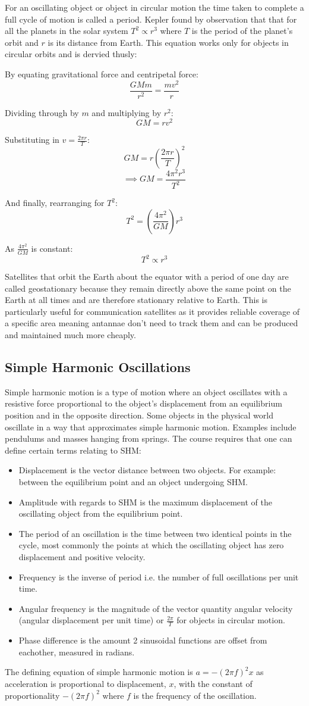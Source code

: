 \documentclass[a4,8pt]{article}
\begin{document}
For an oscillating object or object in circular motion the time taken to complete a full cycle of motion is called a period. Kepler found by observation that that for all the planets in the solar system $T^2 \propto r^3$ where $T$ is the period of the planet's orbit and $r$ is its distance from Earth. This equation works only for objects in circular orbits and is dervied thusly:

By equating gravitational force and centripetal force:
$$\frac{GMm}{r^2} = \frac{mv^2}{r}$$

Dividing through by $m$ and multiplying by $r^2$:
$$GM = rv^2$$

Substituting in $v = \frac{2 \pi r}{T}$:
$$GM = r\left(\frac{2 \pi r}{T}\right)^2$$
$$\implies GM = \frac{4 {\pi}^2 r^3}{T^2}$$

And finally, rearranging for $T^2$:
$$T^2 = \left(\frac{4 {\pi}^2}{GM}\right)r^3$$

As $\frac{4 {\pi}^2}{GM}$ is constant:
$$T^2 \propto r^3$$

Satellites that orbit the Earth about the equator with a period of one day are called geostationary because they remain directly above the same point on the Earth at all times and are therefore stationary relative to Earth. This is particularly useful for communication satellites as it provides reliable coverage of a specific area meaning antannae don't need to track them and can be produced and maintained much more cheaply.

\subsection{Simple Harmonic Oscillations}
Simple harmonic motion is a type of motion where an object oscillates with a resistive force proportional to the object's displacement from an equilibrium position and in the opposite direction. Some objects in the physical world oscillate in a way that approximates simple harmonic motion. Examples include pendulums and masses hanging from springs. The course requires that one can define certain terms relating to SHM:
\begin{itemize}
	\item Displacement is the vector distance between two objects. For example: between the equilibrium point and an object undergoing SHM.
	\item Amplitude with regards to SHM is the maximum displacement of the oscillating object from the equilibrium point.
	\item The period of an oscillation is the time between two identical points in the cycle, most commonly the points at which the oscillating object has zero displacement and positive velocity.
	\item Frequency is the inverse of period i.e. the number of full oscillations per unit time.
	\item Angular frequency is the magnitude of the vector quantity angular velocity (angular displacement per unit time) or $\frac{2\pi}{T}$ for objects in circular motion.
	\item Phase difference is the amount 2 sinusoidal functions are offset from eachother, measured in radians.
\end{itemize}

The defining equation of simple harmonic motion is $a=-(2\pi f)^2 x$ as acceleration is proportional to displacement, $x$, with the constant of proportionality $-(2\pi f)^2$ where $f$ is the frequency of the oscillation. 
\end{document}
